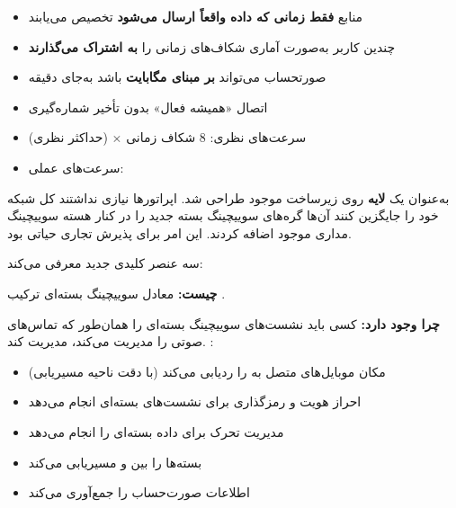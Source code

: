 \begin{itemize}
\tightlist
\item
  منابع \textbf{فقط زمانی که داده واقعاً ارسال می‌شود} تخصیص می‌یابند
\item
  چندین کاربر به‌صورت آماری شکاف‌های زمانی را \textbf{به اشتراک می‌گذارند}
\item
  صورتحساب می‌تواند \textbf{بر مبنای مگابایت} باشد به‌جای دقیقه
\item
  اتصال «همیشه فعال»  بدون تأخیر شماره‌گیری
\item
  سرعت‌های نظری: 8 شکاف زمانی \ensuremath{\times}  (حداکثر نظری)
\item
  سرعت‌های عملی: 
\end{itemize}


 به‌عنوان یک \textbf{لایه} روی زیرساخت موجود  طراحی شد. اپراتورها نیازی نداشتند کل شبکه خود را جایگزین کنند  آن‌ها گره‌های سوییچینگ بسته جدید را در کنار هسته سوییچینگ مداری موجود اضافه کردند. این امر برای پذیرش تجاری حیاتی بود.



\CNchained{}

 سه عنصر کلیدی جدید معرفی می‌کند:


\textbf{چیست:} معادل سوییچینگ بسته‌ای ترکیب .

\textbf{چرا وجود دارد:} کسی باید نشست‌های سوییچینگ بسته‌ای را همان‌طور که  تماس‌های صوتی را مدیریت می‌کند، مدیریت کند. :

\begin{itemize}
\tightlist
\item
  مکان موبایل‌های متصل به  را ردیابی می‌کند (با دقت ناحیه مسیریابی)
\item
  احراز هویت و رمزگذاری برای نشست‌های بسته‌ای انجام می‌دهد
\item
  مدیریت تحرک برای داده بسته‌ای را انجام می‌دهد
\item
  بسته‌ها را بین  و  مسیریابی می‌کند
\item
  اطلاعات صورت‌حساب را جمع‌آوری می‌کند
\end{itemize}

